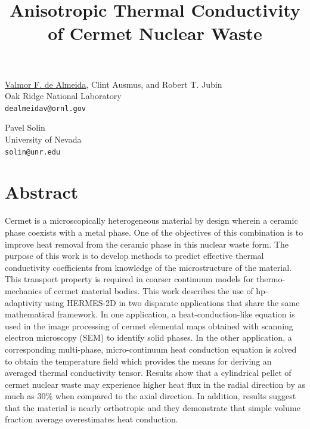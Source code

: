 \title{Anisotropic Thermal Conductivity of Cermet Nuclear Waste}
\author{} \institute{}
\maketitle

\begin{center}
{\large \underline{Valmor F. de Almeida}, Clint Ausmus, and Robert T. Jubin}\\
Oak Ridge National Laboratory\\
{\tt dealmeidav@ornl.gov}\\
\vspace{4mm}

{\large Pavel Solin}\\
University of Nevada\\
{\tt solin@unr.edu}
\end{center}

\section*{Abstract}
Cermet is a microscopically heterogeneous material by design wherein a  ceramic phase coexists with a metal phase. One of the objectives of this combination is to improve heat removal from the  ceramic phase in this nuclear waste form. The purpose of this work is to develop methods to predict effective thermal conductivity coefficients from knowledge of the microstructure of the material. This transport property is required in coarser continuum models for thermo-mechanics of cermet material bodies. This work describes the use of hp-adaptivity using HERMES-2D in two disparate applications that share the same mathematical framework. In one application, a heat-conduction-like equation is used in the image processing of cermet elemental maps obtained with scanning electron microscopy (SEM) to identify solid phases. In the other application, a corresponding multi-phase, micro-continuum heat conduction equation is solved to obtain the temperature field which provides the means for deriving an averaged thermal conductivity tensor. Results show that a cylindrical pellet of cermet nuclear waste  may experience higher heat flux in the radial direction by as much as 30\% when compared to the axial direction. In addition, results suggest that the material is nearly orthotropic and they demonstrate that simple volume fraction average overestimates heat conduction.

